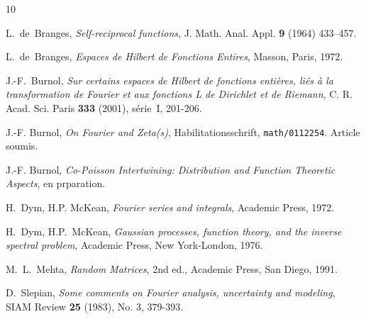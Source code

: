 \documentclass[11pt]{amsart}
\theoremstyle{definition}
\begin{document}

\begin{thebibliography}{10}


 L.~de~Branges, \emph{Self-reciprocal
functions}, J. Math. Anal. Appl. {\bf 9} (1964) 433--457.

 L.~de~Branges, \emph{Espaces de Hilbert de Fonctions Entires},
Masson, Paris, 1972.

 J.-F.~Burnol, \emph{Sur certains espaces de Hilbert de
fonctions enti\`eres{,} li\'es \`a la transformation de Fourier et aux
fonctions L de Dirichlet et de Riemann},  C. R. Acad. Sci. Paris {\bf
333} (2001), s\'erie~I, 201-206.

J.-F. Burnol, \textit{On Fourier and Zeta(s)}, Habilitationsschrift,
\texttt{math/0112254}. Article soumis.

J.-F. Burnol, \textit{Co-Poisson Intertwining: Distribution and Function Theoretic Aspects}, en prparation.


H.~Dym, H.P. McKean, \textit{Fourier series and integrals}, Academic Press,
1972.

H.~Dym, H.P.~McKean, \emph{Gaussian processes, function
theory, and the inverse spectral problem}, Academic Press, New York-London, 1976.

M.~L.~Mehta, \emph{Random Matrices}, 2nd ed., Academic Press, San Diego, 1991.

D.~Slepian, \emph{Some comments on Fourier analysis, uncertainty and modeling}, SIAM Review {\bf 25} (1983), No. 3, 379-393.


%

\end{thebibliography}
\end{document}
